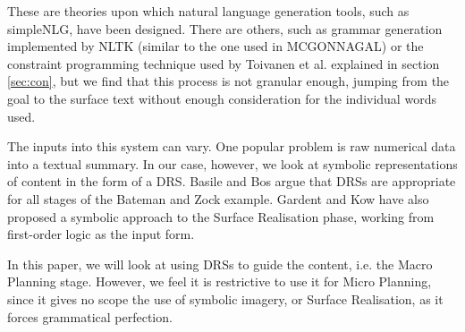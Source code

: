 These are theories upon which natural language generation tools, such as simpleNLG\cite{gatt2009simplenlg}, have been designed. There are others, such as grammar generation implemented by NLTK (similar to the one used in MCGONNAGAL) or the constraint programming technique used by Toivanen et al. explained in section \ref{sec:con}, but we find that this process is not granular enough, jumping from the goal to the surface text without enough consideration for the individual words used.

The inputs into this system can vary. One popular problem is raw numerical data into a textual summary. In our case, however, we look at symbolic representations of content in the form of a DRS. Basile and Bos argue that DRSs are appropriate for all stages of the Bateman and Zock example\cite{basile2011towards}. Gardent and Kow have also proposed a symbolic approach to the Surface Realisation phase, working from first-order logic as the input form\cite{gardent2007symbolic}.

In this paper, we will look at using DRSs to guide the content, i.e. the Macro Planning stage. However, we feel it is restrictive to use it for Micro Planning, since it gives no scope the use of symbolic imagery, or Surface Realisation, as it forces grammatical perfection.






